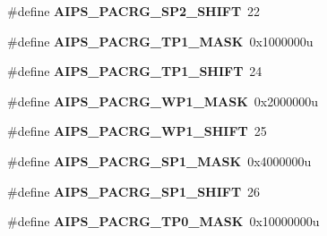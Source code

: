 \begin{DoxyCompactItemize}
\item 
\#define {\bfseries A\+I\+P\+S\+\_\+\+P\+A\+C\+R\+G\+\_\+\+S\+P2\+\_\+\+S\+H\+I\+FT}~22\hypertarget{group__AIPS__Register__Masks_gac96633d0a08176c1e41ade0991ffc926}{}\label{group__AIPS__Register__Masks_gac96633d0a08176c1e41ade0991ffc926}

\item 
\#define {\bfseries A\+I\+P\+S\+\_\+\+P\+A\+C\+R\+G\+\_\+\+T\+P1\+\_\+\+M\+A\+SK}~0x1000000u\hypertarget{group__AIPS__Register__Masks_ga3439f0738de26e4c7ccb572799cba0d6}{}\label{group__AIPS__Register__Masks_ga3439f0738de26e4c7ccb572799cba0d6}

\item 
\#define {\bfseries A\+I\+P\+S\+\_\+\+P\+A\+C\+R\+G\+\_\+\+T\+P1\+\_\+\+S\+H\+I\+FT}~24\hypertarget{group__AIPS__Register__Masks_gac37dd16ba6fb13c582a25c30075b9db7}{}\label{group__AIPS__Register__Masks_gac37dd16ba6fb13c582a25c30075b9db7}

\item 
\#define {\bfseries A\+I\+P\+S\+\_\+\+P\+A\+C\+R\+G\+\_\+\+W\+P1\+\_\+\+M\+A\+SK}~0x2000000u\hypertarget{group__AIPS__Register__Masks_gada02be7d1abce772ece312977971f0b4}{}\label{group__AIPS__Register__Masks_gada02be7d1abce772ece312977971f0b4}

\item 
\#define {\bfseries A\+I\+P\+S\+\_\+\+P\+A\+C\+R\+G\+\_\+\+W\+P1\+\_\+\+S\+H\+I\+FT}~25\hypertarget{group__AIPS__Register__Masks_ga9f3767d4fcaafb07c9200d81a6a24bd3}{}\label{group__AIPS__Register__Masks_ga9f3767d4fcaafb07c9200d81a6a24bd3}

\item 
\#define {\bfseries A\+I\+P\+S\+\_\+\+P\+A\+C\+R\+G\+\_\+\+S\+P1\+\_\+\+M\+A\+SK}~0x4000000u\hypertarget{group__AIPS__Register__Masks_gae5e243cd7212a8b1214be24d78005b09}{}\label{group__AIPS__Register__Masks_gae5e243cd7212a8b1214be24d78005b09}

\item 
\#define {\bfseries A\+I\+P\+S\+\_\+\+P\+A\+C\+R\+G\+\_\+\+S\+P1\+\_\+\+S\+H\+I\+FT}~26\hypertarget{group__AIPS__Register__Masks_ga079300e6e5872ceb463b2b51a5272076}{}\label{group__AIPS__Register__Masks_ga079300e6e5872ceb463b2b51a5272076}

\item 
\#define {\bfseries A\+I\+P\+S\+\_\+\+P\+A\+C\+R\+G\+\_\+\+T\+P0\+\_\+\+M\+A\+SK}~0x10000000u\hypertarget{group__AIPS__Register__Masks_gae025e267c4a27be7a58990361788f39b}{}\label{group__AIPS__Register__Masks_gae025e267c4a27be7a58990361788f39b}


\end{DoxyCompactItemize}
